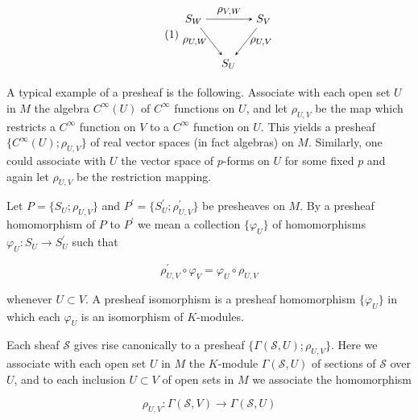 \begin{equation}
\tag{1}\label{eq:5.5:1}
\begin{tikzpicture}[baseline={(current bounding box.center)},>=stealth]
\node (SW) at (0,1.4) {$S_W$};
\node (SV) at (2.2,1.4) {$S_V$};
\node (SU) at (1.1,0) {$S_U$};
\draw[->] (SW) -- node[above] {$\rho_{V,W}$} (SV);
\draw[->] (SW) -- node[left] {$\rho_{U,W}$} (SU);
\draw[->] (SV) -- node[right] {$\rho_{U,V}$} (SU);
\end{tikzpicture}
\end{equation}

A typical example of a presheaf is the following. Associate with each open set $U$ in $M$ the algebra $C^\infty(U)$ of $C^\infty$ functions on $U$, and let $\rho_{U,V}$ be the map which restricts a $C^\infty$ function on $V$ to a $C^\infty$ function on $U$. This yields a presheaf $\{C^\infty(U);\rho_{U,V}\}$ of real vector spaces (in fact algebras) on $M$. Similarly, one could associate with $U$ the vector space of $p$-forms on $U$ for some fixed $p$ and again let $\rho_{U,V}$ be the restriction mapping.

Let $P=\{S_{U};\rho_{U,V}\}$ and $P^{\prime}=\{S_{U}^{\prime};\rho_{U,V}^{\prime}\}$ be presheaves on $M$. By a presheaf homomorphism of $P$ to $P^{\prime}$ we mean a collection $\{\varphi_{U}\}$ of homomorphisms $\varphi_{U}\colon S_{U}\to S_{U}^{\prime}$ such that

\begin{equation}
\tag{2}\label{eq:5.5:2}
\rho_{U,V}^{\prime}\circ\varphi_{V}=\varphi_{U}\circ\rho_{U,V}
\end{equation}

whenever $U \subset V$. A presheaf isomorphism is a presheaf homomorphism $\{\varphi_{U}\}$ in which each $\varphi_{U}$ is an isomorphism of $K$-modules.

\label{thm:5.6} Each sheaf  $ \mathcal{S} $ gives rise canonically to a presheaf  $ \{\Gamma(\mathcal{S},U);\rho_{U,V}\} $. Here we associate with each open set  $ U $ in  $ M $ the  $ K $-module  $ \Gamma(\mathcal{S},U) $ of sections of  $ \mathcal{S} $ over  $ U $, and to each inclusion  $ U \subset V $ of open sets in  $ M $ we associate the homomorphism

\begin{equation}
\tag{1}\label{eq:5.6:1}
\rho_{U,V}\colon\Gamma(\mathcal{S},V)\to\Gamma(\mathcal{S},U)
\end{equation}

